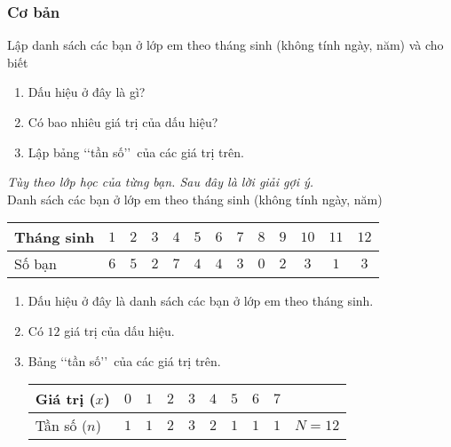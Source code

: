 \subsubsection{Cơ bản}
\begin{bt}%
	Lập danh sách các bạn ở lớp em theo tháng sinh (không tính ngày, năm) và cho biết
	\begin{enumerate}
		\item Dấu hiệu ở đây là gì?
		\item Có bao nhiêu giá trị của dấu hiệu?
		\item Lập bảng \lq\lq tần số\rq\rq\ của các giá trị trên.
	\end{enumerate}
	\loigiai
	{
		\textit{Tùy theo lớp học của từng bạn. Sau đây là lời giải gợi ý.}\\
		Danh sách các bạn ở lớp em theo tháng sinh (không tính ngày, năm)
		\begin{center}
			\begin{tabular}{|l|c|c|c|c|c|c|c|c|c|c|c|c|}
				\hline
				Tháng sinh &$1$  &$2$ &$3$ &$4$ &$5$ &$6$ &$7$ &$8$ &$9$ &$10$ &$11$ &$12$\\
				\hline
				Số bạn &$6$ &$5$ &$2$ &$7$ &$4$ &$4$ &$3$ &$0$ &$2$ &$3$ &$1$ &$3$\\
				\hline
			\end{tabular}
		\end{center}
		\begin{enumerate}
			\item Dấu hiệu ở đây là danh sách các bạn ở lớp em theo tháng sinh.
			\item Có $12$ giá trị của dấu hiệu.
			\item Bảng \lq\lq tần số\rq\rq\ của các giá trị trên.
			\begin{center}
				\begin{tabular}{|l|c|c|c|c|c|c|c|c|l|}
					\hline
					Giá trị ($x$) &$0$ &$1$ &$2$ &$3$ &$4$ &$5$ &$6$ &$7$ &\\
					\hline
					Tần số ($n$) &$1$ &$1$ &$2$ &$3$ &$2$ &$1$ &$1$ &$1$ &$N=12$\\
					\hline
				\end{tabular}
			\end{center}
		\end{enumerate}
	}
\end{bt}
